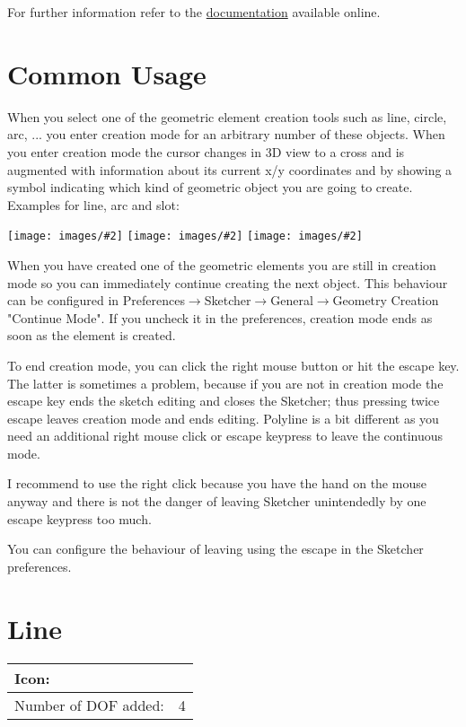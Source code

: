 \documentclass[12pt,titlepage]{article}
\newcommand{\menu}{\mbox{$\rightarrow$}}
\newcommand{\icon}[1]{\raisebox{-1em}{\rule{0pt}{27pt}\texttt{[image: images/\#1]}}}
\newcommand{\img}[2]{\vspace{2ex}\noindent\texttt{[image: images/\#2]}}
\newcommand{\dofAdded}{Number of DOF added:}
\begin{document}
For further information refer to the
\href{https://www.freecadweb.org/wiki/Sketcher_Workbench}{documentation} available online.

\section{Common Usage}
When you select one of the geometric element creation tools such as line,
circle, arc, ...
you enter creation mode for an arbitrary number of these objects. When you
enter creation mode the cursor changes in 3D view to a cross and is augmented
with information about its current x/y coordinates and by showing a symbol
indicating which kind of geometric object you are going to create. Examples
for line, arc and slot:

\img{width=0.3\textwidth}{CursorLine}\hfill
\img{width=0.3\textwidth}{CursorArc}\hfill
\img{width=0.3\textwidth}{CursorSlot}

When you have created one of the geometric elements you are still in creation mode so
you can immediately continue creating the next object. This behaviour can be
configured in Preferences\menu Sketcher\menu General\menu Geometry Creation "Continue
Mode". If you uncheck it in the preferences, creation mode ends as soon as
the element is created.

To end creation mode, you can click the right mouse button or hit the escape key. The
latter is sometimes a problem, because if you are not in creation mode the escape key
ends the sketch editing and closes the Sketcher; thus pressing twice escape leaves
creation mode and ends editing. Polyline is a bit different as you need an additional
right mouse click or escape keypress to leave the continuous mode.

I recommend to use the right click because you have the
hand on the mouse anyway and there is not the danger of leaving Sketcher unintendedly
by one escape keypress too much.

You can configure the behaviour of leaving using the escape in the Sketcher
preferences.

\section{Line}
\begin{tabular}{|l|l|}
\hline
Icon: & \icon{Sketcher_CreateLine}\\
\hline
\dofAdded & 4\\
\hline
\end{tabular}
\end{document}
